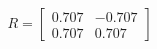\documentclass[preview]{standalone}
\begin{document}
\begin{align*}
R = \begin{bmatrix} 0.707 & -0.707 \\ 0.707 & 0.707 \end{bmatrix}
\end{align*}
\end{document}
